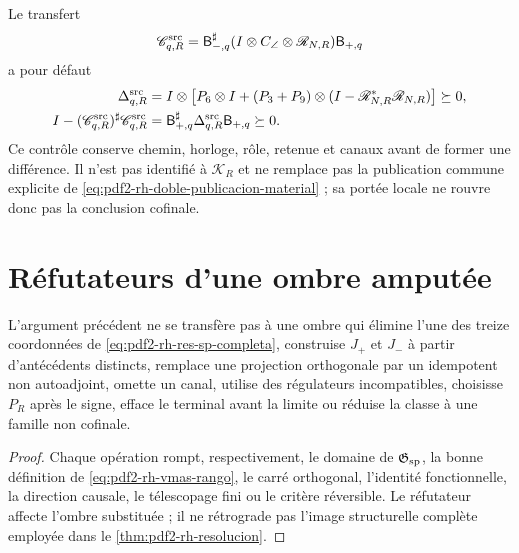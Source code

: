 Le transfert
\begin{equation}\label{eq:pdf2-rh-source-transferencia}
 \mathscr C_{q,R}^{\rm src}
 =\mathsf B_{-,q}^{\sharp}
  (I\otimes C_\angle\otimes\mathscr R_{N,R})\mathsf B_{+,q}
\end{equation}
a pour défaut
\begin{align}
 \Delta_{q,R}^{\rm src}
 ={}&I\otimes\bigl[P_6\otimes I
 +(P_3+P_9)\otimes
 (I-\mathscr R_{N,R}^*\mathscr R_{N,R})\bigr]\succeq0,
 \label{eq:pdf2-rh-source-delta}\\
 I-(\mathscr C_{q,R}^{\rm src})^\sharp\mathscr C_{q,R}^{\rm src}
 ={}&\mathsf B_{+,q}^{\sharp}\Delta_{q,R}^{\rm src}
 \mathsf B_{+,q}\succeq0.
 \label{eq:pdf2-rh-source-contractividad}
\end{align}
Ce contrôle conserve chemin, horloge, rôle, retenue et canaux avant de former
une différence. Il n'est pas identifié à \(\mathcal K_R\) et ne remplace pas la
publication commune explicite de
\eqref{eq:pdf2-rh-doble-publicacion-material} ; sa portée locale ne
rouvre donc pas la conclusion cofinale.

\section{Réfutateurs d'une ombre amputée}

\begin{falsifier}
L'argument précédent ne se transfère pas à une ombre qui élimine l'une des
treize coordonnées de \eqref{eq:pdf2-rh-res-sp-completa}, construise \(J_+\) et
\(J_-\) à partir d'antécédents distincts, remplace une projection orthogonale par
un idempotent non autoadjoint, omette un canal, utilise des régulateurs incompatibles,
choisisse \(P_R\) après le signe, efface le terminal avant la limite ou réduise
la classe à une famille non cofinale.
\end{falsifier}

\begin{proof}
Chaque opération rompt, respectivement, le domaine de
\(\mathfrak G_{\rm sp}\), la bonne définition de
\eqref{eq:pdf2-rh-vmas-rango}, le carré orthogonal, l'identité fonctionnelle,
la direction causale, le télescopage fini ou le critère réversible. Le
réfutateur affecte l'ombre substituée ; il ne rétrograde pas l'image structurelle
complète employée dans le \cref{thm:pdf2-rh-resolucion}.
\end{proof}

